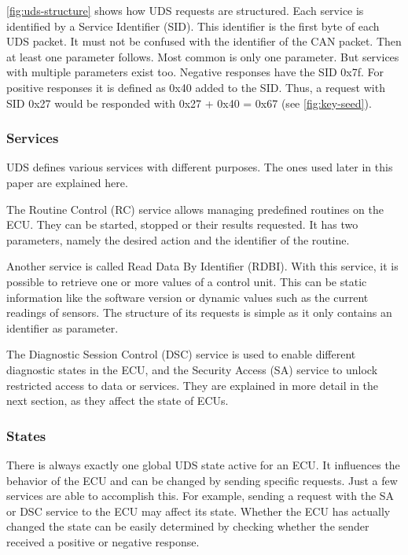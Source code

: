 \autoref{fig:uds-structure} shows how UDS requests are structured. Each service is identified by a Service Identifier (SID). This identifier is the first byte of each UDS packet. It must not be confused with the identifier of the CAN packet. Then at least one parameter follows. Most common is only one parameter. But services with multiple parameters exist too.
Negative responses have the SID 0x7f.
For positive responses it is defined as 0x40 added to the SID. Thus, a request with SID 0x27 would be responded with 0x27 + 0x40 = 0x67 (see \autoref{fig:key-seed}).

\subsubsection{Services}
\label{subsubsec:uds-services}

UDS defines various services with different purposes. The ones used later in this paper are explained here.

The Routine Control (RC) service allows managing predefined routines on the ECU. They can be started, stopped or their results requested. It has two parameters, namely the desired action and the identifier of the routine.

Another service is called Read Data By Identifier (RDBI). With this service, it is possible to retrieve one or more values of a control unit. This can be static information like the software version or dynamic values such as the current readings of sensors. The structure of its requests is simple as it only contains an identifier as parameter.

The Diagnostic Session Control (DSC) service is used to enable different diagnostic states in the ECU, and the Security Access (SA) service to unlock restricted access to data or services. They are explained in more detail in the next section, as they affect the state of ECUs.

\subsubsection{States}
\label{subsec:states}

There is always exactly one global UDS state active for an ECU. It influences the behavior of the ECU and can be changed by sending specific requests. Just a few services are able to accomplish this. For example, sending a request with the SA or DSC service to the ECU may affect its state. Whether the ECU has actually changed the state can be easily determined by checking whether the sender received a positive or negative response.

